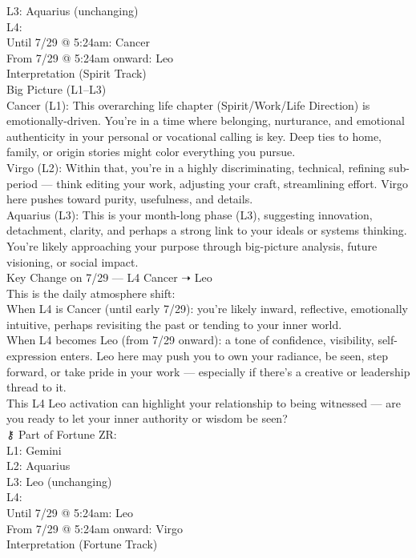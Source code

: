 \documentclass{article}
\begin{document}
L3: Aquarius (unchanging)\\
L4:\\
Until 7/29 @ 5:24am: Cancer\\
From 7/29 @ 5:24am onward: Leo\\
Interpretation (Spirit Track)\\
Big Picture (L1--L3)\\
Cancer (L1): This overarching life chapter (Spirit/Work/Life Direction) is emotionally-driven. You're in a time where belonging, nurturance, and emotional authenticity in your personal or vocational calling is key. Deep ties to home, family, or origin stories might color everything you pursue.\\
Virgo (L2): Within that, you're in a highly discriminating, technical, refining sub-period --- think editing your work, adjusting your craft, streamlining effort. Virgo here pushes toward purity, usefulness, and details.\\
Aquarius (L3): This is your month-long phase (L3), suggesting innovation, detachment, clarity, and perhaps a strong link to your ideals or systems thinking. You're likely approaching your purpose through big-picture analysis, future visioning, or social impact.\\
Key Change on 7/29 --- L4 Cancer ➝ Leo\\
This is the daily atmosphere shift:\\
When L4 is Cancer (until early 7/29): you're likely inward, reflective, emotionally intuitive, perhaps revisiting the past or tending to your inner world.\\
When L4 becomes Leo (from 7/29 onward): a tone of confidence, visibility, self-expression enters. Leo here may push you to own your radiance, be seen, step forward, or take pride in your work --- especially if there's a creative or leadership thread to it.\\
This L4 Leo activation can highlight your relationship to being witnessed --- are you ready to let your inner authority or wisdom be seen?\\
⚷ Part of Fortune ZR:\\
L1: Gemini\\
L2: Aquarius\\
L3: Leo (unchanging)\\
L4:\\
Until 7/29 @ 5:24am: Leo\\
From 7/29 @ 5:24am onward: Virgo\\
Interpretation (Fortune Track)\\
\end{document}
